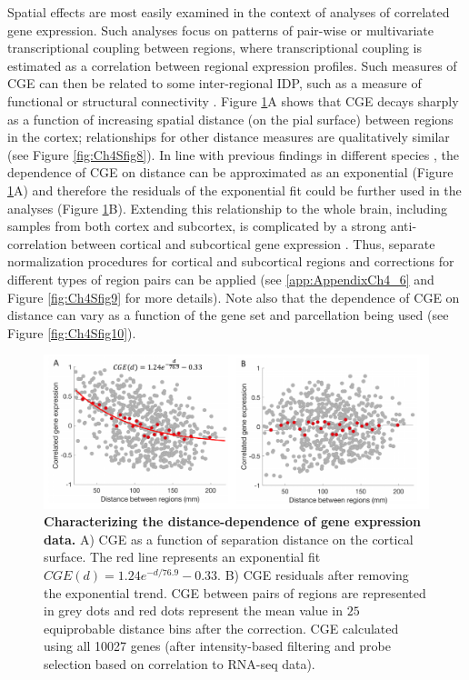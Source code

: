 Spatial effects are most easily examined in the context of analyses of correlated gene expression. Such analyses focus on patterns of pair-wise or multivariate transcriptional coupling between regions, where transcriptional coupling is estimated as a correlation between regional expression profiles. Such measures of CGE can then be related to some inter-regional IDP, such as a measure of functional or structural connectivity \citep{Richiardi2015,Fulcher2016,Arnatkeviciute2018}. Figure \ref{fig:Ch4Fig8}A shows that CGE decays sharply as a function of increasing spatial distance (on the pial surface) between regions in the cortex; relationships for other distance measures are qualitatively similar (see Figure \ref{fig:Ch4Sfig8}). In line with previous findings in different species \citep{Fulcher2016,Arnatkeviciute2018}, the dependence of CGE on distance can be approximated as an exponential (Figure \ref{fig:Ch4Fig8}A) and therefore the residuals of the exponential fit could be further used in the analyses (Figure \ref{fig:Ch4Fig8}B). Extending this relationship to the whole brain, including samples from both cortex and subcortex, is complicated by a strong anti-correlation between cortical and subcortical gene expression \citep{Hawrylycz2015}. Thus, separate normalization procedures for cortical and subcortical regions and corrections for different types of region pairs can be applied (see \ref{app:AppendixCh4_6} and Figure \ref{fig:Ch4Sfig9} for more details). Note also that the dependence of CGE on distance can vary as a function of the gene set and parcellation being used (see Figure \ref{fig:Ch4Sfig10}).

\begin{figure}[h]
  \centering
    \includegraphics[width=1\textwidth]{Chapter4/Ch4Fig8.pdf}
\caption{\textbf{Characterizing the distance-dependence of gene expression data.}
A) CGE as a function of separation distance on the cortical surface. The red line represents an exponential fit $CGE(d) = 1.24e^{-d/76.9}-0.33$.
B) CGE residuals after removing the exponential trend. CGE between pairs of regions are represented in grey dots and red dots represent the mean value in $25$ equiprobable distance bins after the correction. CGE calculated using all \num{10027} genes (after intensity-based filtering and probe selection based on correlation to RNA-seq data).}
\label{fig:Ch4Fig8}
\end{figure}

